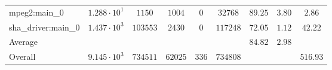 \begin{tabular}{|l|c|c|c|c|c|c|c|c|}
mpeg2:main\_0           & $ 1.288 \cdot 10^{1} $ & $ 1150   $ & $ 1004  $ & $ 0   $ & $ 32768  $ & $ 89.25       $ & $ 3.80    $ & $ 2.86    $ \\
sha\_driver:main\_0     & $ 1.437 \cdot 10^{3} $ & $ 103553 $ & $ 2430  $ & $ 0   $ & $ 117248 $ & $ 72.05       $ & $ 1.12    $ & $ 42.22   $ \\
\hline
Average                 & $                    $ & $        $ & $       $ & $     $ & $        $ & $ 84.82       $ & $ 2.98    $ & $         $ \\
\hline
Overall                 & $ 9.145 \cdot 10^{3} $ & $ 734511 $ & $ 62025 $ & $ 336 $ & $ 734808 $ & $             $ & $         $ & $ 516.93  $ \\
\hline
\end{tabular}
